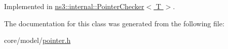 Implemented in \hyperlink{classns3_1_1internal_1_1PointerChecker_a31af4cef7de16fb123c6489b0a759111}{ns3\+::internal\+::\+Pointer\+Checker$<$ T $>$}.



The documentation for this class was generated from the following file\+:\begin{DoxyCompactItemize}
\item 
core/model/\hyperlink{pointer_8h}{pointer.\+h}\end{DoxyCompactItemize}
